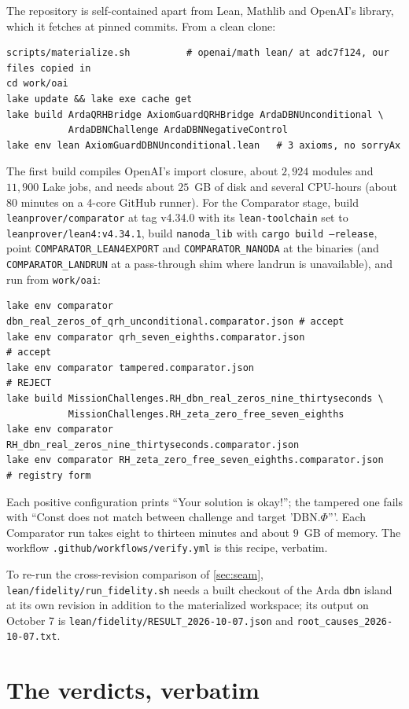 \documentclass[11pt]{article}
\theoremstyle{definition}
\begin{document}
The repository \cite{Repo} is self-contained apart from Lean, Mathlib and OpenAI's library, which it fetches at pinned commits. From a clean clone:
\begin{verbatim}
scripts/materialize.sh          # openai/math lean/ at adc7f124, our files copied in
cd work/oai
lake update && lake exe cache get
lake build ArdaQRHBridge AxiomGuardQRHBridge ArdaDBNUnconditional \
           ArdaDBNChallenge ArdaDBNNegativeControl
lake env lean AxiomGuardDBNUnconditional.lean   # 3 axioms, no sorryAx
\end{verbatim}
The first build compiles OpenAI's import closure, about $2{,}924$ modules and $11{,}900$ Lake jobs, and needs about $25$~GB of disk and several CPU-hours (about $80$ minutes on a 4-core GitHub runner). For the Comparator stage, build \texttt{leanprover/comparator} at tag v4.34.0 with its \texttt{lean-toolchain} set to \texttt{leanprover/lean4:v4.34.1}, build \texttt{nanoda\_lib} with \texttt{cargo build --release}, point \texttt{COMPARATOR\_LEAN4EXPORT} and \texttt{COMPARATOR\_NANODA} at the binaries (and \texttt{COMPARATOR\_LANDRUN} at a pass-through shim where landrun is unavailable), and run from \texttt{work/oai}:
\begin{verbatim}
lake env comparator dbn_real_zeros_of_qrh_unconditional.comparator.json # accept
lake env comparator qrh_seven_eighths.comparator.json                   # accept
lake env comparator tampered.comparator.json                            # REJECT
lake build MissionChallenges.RH_dbn_real_zeros_nine_thirtyseconds \
           MissionChallenges.RH_zeta_zero_free_seven_eighths
lake env comparator RH_dbn_real_zeros_nine_thirtyseconds.comparator.json
lake env comparator RH_zeta_zero_free_seven_eighths.comparator.json      # registry form
\end{verbatim}
Each positive configuration prints ``Your solution is okay!''; the tampered one fails with ``Const does not match between challenge and target 'DBN.$\Phi$'''. Each Comparator run takes eight to thirteen minutes and about $9$~GB of memory. The workflow \texttt{.github/workflows/verify.yml} is this recipe, verbatim.

To re-run the cross-revision comparison of \cref{sec:seam}, \texttt{lean/fidelity/run\_fidelity.sh} needs a built checkout of the Arda \texttt{dbn} island at its own revision in addition to the materialized workspace; its output on October 7 is \texttt{lean/fidelity/RESULT\_2026-10-07.json} and \texttt{root\_causes\_2026-10-07.txt}.

\section{The verdicts, verbatim}\label{app:logs}
\end{document}
